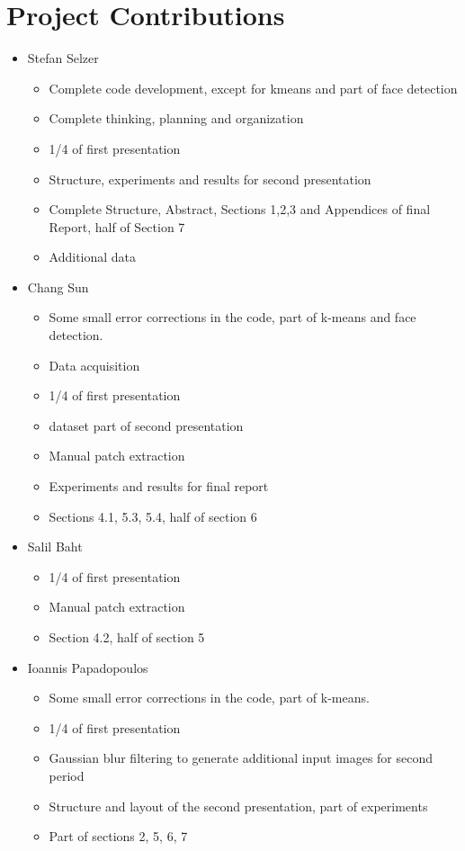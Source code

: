 \section{Project Contributions}

\begin{itemize}
	\item Stefan Selzer
	\begin{itemize}
	\item Complete code development, except for kmeans and part of face detection
	\item Complete thinking, planning and organization
	\item 1/4 of first presentation
	\item Structure, experiments and results for second presentation
	\item Complete Structure, Abstract, Sections 1,2,3 and Appendices of final Report, half of Section 7
	\item Additional data
	\end{itemize}
	\item Chang Sun
	\begin{itemize}
	\item Some small error corrections in the code, part of k-means and face detection.
	\item Data acquisition
	\item 1/4 of first presentation
	\item dataset part of second presentation
	\item Manual patch extraction
	\item Experiments and results for final report
	\item Sections 4.1, 5.3, 5.4, half of section 6
	\end{itemize}
	\item Salil Baht
	\begin{itemize}
	\item 1/4 of first presentation
	\item Manual patch extraction
	\item Section 4.2, half of section 5
	\end{itemize}
	\item Ioannis Papadopoulos
	\begin{itemize}
	\item Some small error corrections in the code, part of k-means.
	\item 1/4 of first presentation
	\item Gaussian blur filtering to generate additional input images for second period
	\item Structure and layout of the second presentation, part of experiments
	\item Part of sections 2, 5, 6, 7
	\end{itemize}
\end{itemize}
